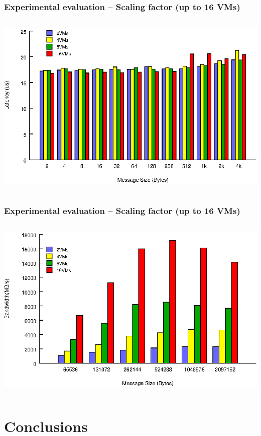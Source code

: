 \documentclass[red,slidestop,notes,compress,mathserif]{beamer}
\begin{document}
\begin{frame}
\frametitle{Experimental evaluation -- Scaling factor (up to 16 VMs)}
\begin{columns}
\includegraphics[width=\textwidth]{figures/lat_stream_scale.eps}
\end{columns}

\end{frame}
\begin{frame}
\frametitle{Experimental evaluation -- Scaling factor (up to 16 VMs)}
\begin{columns}
\includegraphics[width=\textwidth]{figures/bw_stream_scale.eps}
\end{columns}
\end{frame}

\section*{Conclusions}
\end{document}
